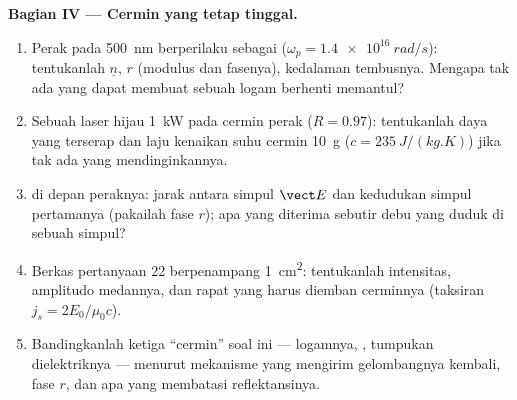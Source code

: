 \begin{problem}
\medskip
\noindent\textbf{Bagian IV --- Cermin yang tetap tinggal.}
\begin{enumerate}[resume]
  \item Perak pada \qty{500}{nm} berperilaku sebagai  ($\omega_p = \qty{1.4e16}{rad/s}$):
        tentukanlah $\underline n$, $r$ (modulus dan fasenya), kedalaman tembusnya. Mengapa tak ada
         yang dapat membuat sebuah logam berhenti memantul?
  \item Sebuah laser hijau \qty{1}{kW} pada cermin perak ($R = 0.97$): tentukanlah daya
        yang terserap dan laju kenaikan suhu cermin \qty{10}{g}
        ($c = \qty{235}{J/(kg.K)}$) jika tak ada yang mendinginkannya.
  \item {} di depan peraknya: jarak antara simpul
        $\vect E$ dan kedudukan simpul pertamanya (pakailah fase $r$);
        apa yang diterima sebutir debu yang duduk di sebuah simpul?
  \item Berkas pertanyaan 22 berpenampang \qty{1}{cm^2}: tentukanlah intensitas, amplitudo
        medannya, dan rapat  yang harus diemban
        cerminnya (taksiran  $j_s = 2E_0/\mu_0c$).
  \item Bandingkanlah ketiga ``cermin'' soal ini --- logamnya,
        , tumpukan dielektriknya --- menurut mekanisme yang mengirim
        gelombangnya kembali, fase $r$, dan apa yang membatasi
        reflektansinya.
\end{enumerate}
\end{problem}
